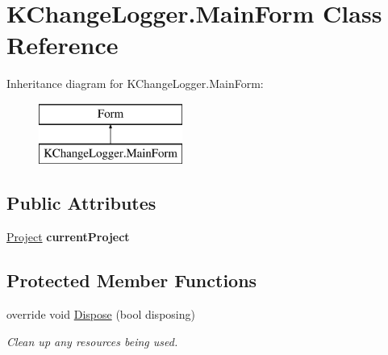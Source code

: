 \hypertarget{class_k_change_logger_1_1_main_form}{\section{K\-Change\-Logger.\-Main\-Form Class Reference}
\label{class_k_change_logger_1_1_main_form}
}
Inheritance diagram for K\-Change\-Logger.\-Main\-Form\-:\begin{figure}[H]
\begin{center}
\leavevmode
\includegraphics[height=2.000000cm]{class_k_change_logger_1_1_main_form}
\end{center}
\end{figure}
\subsection*{Public Attributes}
\begin{DoxyCompactItemize}
\item 
\hypertarget{class_k_change_logger_1_1_main_form_a0c4d9ad4e4b40fa1eb6953ed2f53e519}{\hyperlink{class_k_change_logger_1_1_project}{Project} {\bfseries current\-Project}}\label{class_k_change_logger_1_1_main_form_a0c4d9ad4e4b40fa1eb6953ed2f53e519}

\end{DoxyCompactItemize}
\subsection*{Protected Member Functions}
\begin{DoxyCompactItemize}
\item 
override void \hyperlink{class_k_change_logger_1_1_main_form_aee15b4b76ee44d8fd02f134b3f985e17}{Dispose} (bool disposing)
\begin{DoxyCompactList}\small\item\em Clean up any resources being used. \end{DoxyCompactList}\end{DoxyCompactItemize}


